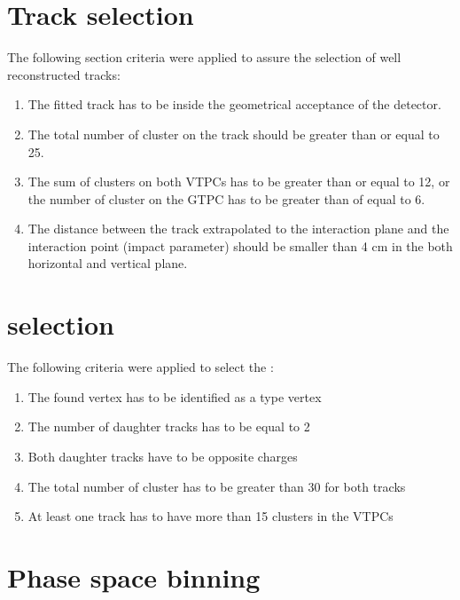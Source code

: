 \section{Track selection}
\label{sec:hadron:trackselection}


The following section criteria were applied to assure
the selection of well reconstructed tracks:
\begin{enumerate}[label=(\roman*)]
\item The fitted track has to be inside the geometrical acceptance of the detector.
\item The total number of cluster on the track should be greater than or equal to 25.
\item The sum of clusters on both VTPCs has to be greater than or equal to 12, or
  the number of cluster on the GTPC has to be greater than of equal to 6.
\item The distance between the track extrapolated to the interaction plane and the
  interaction point (impact parameter) should be smaller than 4 cm in the both horizontal
  and vertical plane.
\end{enumerate}


\section{\vzero selection}
\label{sec:hadron:vzeroselection}

The following criteria were applied to select the \vzeros:
\begin{enumerate}
\item The found vertex has to be identified as a \vzero type vertex
\item The number of daughter tracks has to be equal to 2
\item Both daughter tracks have to be opposite charges
\item The total number of cluster has to be greater than 30 for both tracks
\item At least one track has to have more than 15 clusters in the VTPCs
\end{enumerate}


\section{Phase space binning}

